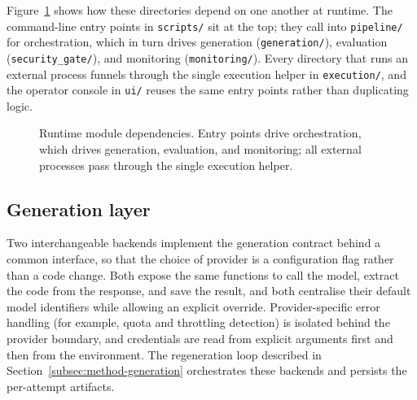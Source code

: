 Figure~\ref{fig:impl-modules} shows how these directories depend on one another at
runtime. The command-line entry points in \texttt{scripts/} sit at the top; they call
into \texttt{pipeline/} for orchestration, which in turn drives generation
(\texttt{generation/}), evaluation (\texttt{security\_gate/}), and monitoring (\texttt{monitoring/}). Every
directory that runs an external process funnels through the single execution helper in
\texttt{execution/}, and the operator console in \texttt{ui/} reuses the same entry
points rather than duplicating logic.

\begin{figure}[ht]
\centering
{}
\caption{Runtime module dependencies. Entry points drive orchestration, which drives
generation, evaluation, and monitoring; all external processes pass through the single
execution helper.}
\label{fig:impl-modules}
\end{figure}

\subsection{Generation layer}
\label{subsec:impl-generation}

Two interchangeable backends implement the generation contract behind a common
interface, so that the choice of provider is a configuration flag rather than a code
change. Both expose the same functions to call the model, extract the code from the
response, and save the result, and both centralise their default model identifiers while
allowing an explicit override. Provider-specific error handling (for example, quota and
throttling detection) is isolated behind the provider boundary, and credentials are read
from explicit arguments first and then from the environment. The regeneration loop
described in Section~\ref{subsec:method-generation} orchestrates these backends and persists the
per-attempt artifacts.

